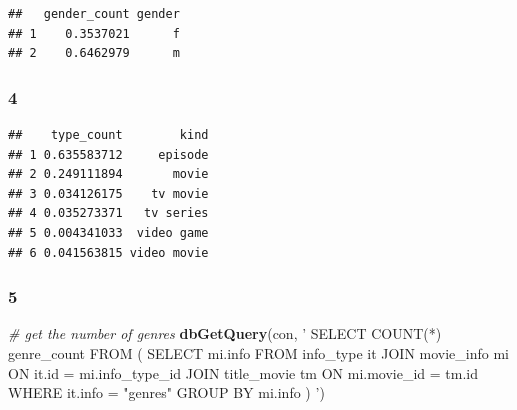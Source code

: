 \documentclass[]{article}
\newenvironment{Shaded}{\begin{snugshade}}{\end{snugshade}}
\newcommand{\KeywordTok}[1]{\textcolor[rgb]{0.13,0.29,0.53}{\textbf{{#1}}}}
\newcommand{\DecValTok}[1]{\textcolor[rgb]{0.00,0.00,0.81}{{#1}}}
\newcommand{\StringTok}[1]{\textcolor[rgb]{0.31,0.60,0.02}{{#1}}}
\newcommand{\CommentTok}[1]{\textcolor[rgb]{0.56,0.35,0.01}{\textit{{#1}}}}
\newcommand{\NormalTok}[1]{{#1}}
\begin{document}
\begin{verbatim}
##   gender_count gender
## 1    0.3537021      f
## 2    0.6462979      m
\end{verbatim}

\subsubsection{4}\label{section-2}

\begin{Shaded}
\end{Shaded}

\begin{verbatim}
##    type_count        kind
## 1 0.635583712     episode
## 2 0.249111894       movie
## 3 0.034126175    tv movie
## 4 0.035273371   tv series
## 5 0.004341033  video game
## 6 0.041563815 video movie
\end{verbatim}

\subsubsection{5}\label{section}

\begin{Shaded}
\begin{Highlighting}[]
\CommentTok{# get the number of genres}
\KeywordTok{dbGetQuery}\NormalTok{(con, }\StringTok{'}
\StringTok{           SELECT COUNT(*) genre_count}
\StringTok{           FROM (}
\StringTok{              SELECT mi.info}
\StringTok{              FROM info_type it JOIN movie_info mi ON it.id = mi.info_type_id}
\StringTok{                  JOIN title_movie tm ON mi.movie_id = tm.id}
\StringTok{              WHERE it.info = "genres"}
\StringTok{              GROUP BY mi.info}
\StringTok{           )}
\StringTok{           '}\NormalTok{)}
\end{Highlighting}
\end{Shaded}
\end{document}
